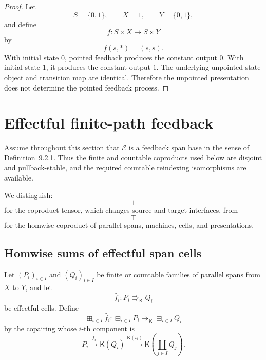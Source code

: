 \begin{proof}
Let
\[
    S=\{0,1\},
    \qquad
    X=1,
    \qquad
    Y=\{0,1\},
\]
and define
\[
    f:S\times X\longrightarrow S\times Y
\]
by
\[
    f(s,*)=(s,s).
\]
With initial state \(0\), pointed feedback produces the constant output
\(0\).  With initial state \(1\), it produces the constant output \(1\).
The underlying unpointed state object and transition map are identical.
Therefore the unpointed presentation does not determine the pointed
feedback process.
\end{proof}

\section{Effectful finite-path feedback}
\label{sec:effectful-finite-path-feedback}

Assume throughout this section that \(\mathcal E\) is a feedback span base in
the sense of Definition~9.2.1.  Thus the finite and countable coproducts used
below are disjoint and pullback-stable, and the required countable
reindexing isomorphisms are available.

We distinguish:
\[
    +
\]
for the coproduct tensor, which changes source and target interfaces, from
\[
    \boxplus
\]
for the homwise coproduct of parallel spans, machines, cells, and
presentations.

\subsection{Homwise sums of effectful span cells}
\label{subsec:homwise-sums-effectful-cells}

Let \((P_i)_{i\in I}\) and \((Q_i)_{i\in I}\) be finite or countable families
of parallel spans from \(X\) to \(Y\), and let
\[
    \widehat f_i:
    P_i\Rrightarrow_{\mathsf K}Q_i
\]
be effectful cells.  Define
\[
    \boxplus_{i\in I}\widehat f_i:
    \boxplus_{i\in I}P_i
    \Rrightarrow_{\mathsf K}
    \boxplus_{i\in I}Q_i
\]
by the copairing whose \(i\)-th component is
\[
    P_i
    \xrightarrow{\widehat f_i}
    \mathsf K(Q_i)
    \xrightarrow{\mathsf K(\iota_i)}
    \mathsf K
    \left(
        \coprod_{j\in I}Q_j
    \right).
\]

